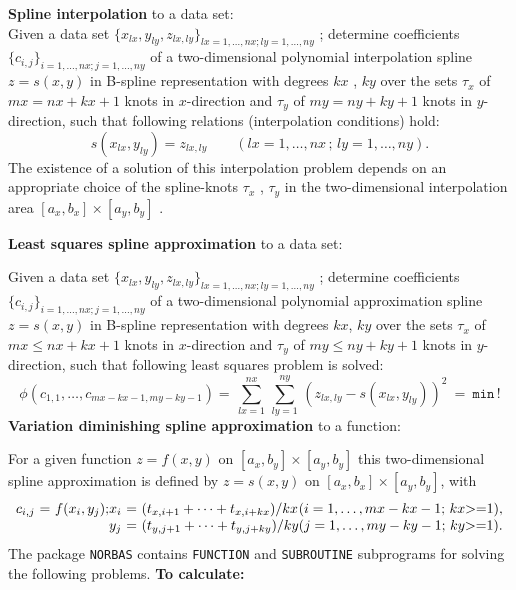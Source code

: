 {\bf Spline interpolation} to a data set: \\
Given a data set $\{x_{lx},y_{ly},z_{lx,ly}\}_{lx=1, \ldots ,nx ;
ly=1, \ldots , ny}$ ; determine coefficients
$\{c_{i,j}\}_{i=1, \ldots ,nx ; j=1, \ldots ,ny}$ of a
two-dimensional polynomial interpolation spline $z = s(x,y)$ in B-spline
representation with degrees $kx$ , $ky$ over the sets $\tau_x$
of $mx=nx+kx+1$ knots in $x$-direction and $\tau_y$ of $my=ny+ky+1$
knots in $y$-direction, such that following relations
(interpolation conditions) hold:
$$s(x_{lx},y_{ly}) = z_{lx,ly} \qquad
(lx=1, \ldots ,nx \, ; \, ly=1, \ldots ,ny) .$$
The existence of a solution of this interpolation problem depends
on an appropriate choice of the spline-knots $\tau_x$ , $\tau_y$ in the
two-dimensional interpolation area $[a_x,b_x] \times [a_y,b_y]$ .
\par
{\bf Least squares spline approximation} to a data set:
\par
Given a data set $\{x_{lx},y_{ly},z_{lx,ly}\}_{lx=1, \ldots ,nx ;
ly=1, \ldots , ny}$ ; determine coefficients
$\{c_{i,j}\}_{i=1, \ldots ,nx ; j=1, \ldots ,ny}$ of a
two-dimensional polynomial approximation spline $z = s(x,y)$ in B-spline
representation with degrees $kx$, $ky$ over the sets $\tau_x$
of $mx \le nx+kx+1$ knots in $x$-direction and $\tau_y$ of
$my \le ny+ky+1$ knots in $y$-direction, such that following
least squares problem is solved:
$$\phi (c_{1,1}, \ldots ,c_{mx-kx-1,my-ky-1}) = \,
\sum_{lx=1}^{nx} \, \sum_{ly=1}^{ny} \,
\left(z_{lx,ly}-s(x_{lx},y_{ly})\right)^2 \ = \ \mathtt{min\,!}$$
{\bf Variation diminishing spline approximation} to a function:
\par
For a given function $z = f(x,y)$ on $[a_x,b_y] \times [a_y,b_y]$ this
two-dimensional spline approximation is defined by $z = s(x,y)$
on $[a_x,b_x] \times [a_y,b_y]$, with
\[ \begin{array}{r@{\ =\ }l@{\qquad}r@{\ =\ }l@{\quad}l}
c_{i,j} & f(x_i,y_j); & x_i & (t_{x,i+1}+\cdots+t_{x,i+kx})/kx &
                               (i=1,\ldots,mx-kx-1;\,kx \ge 1), \\
\multicolumn{2}{c}{}  & y_j & (t_{y,j+1}+\cdots+t_{y,j+ky})/ky &
                               (j=1,\ldots,my-ky-1;\,ky \ge 1).
\end{array} \]
\newpage
The package {\tt NORBAS} contains {\tt FUNCTION} and {\tt SUBROUTINE}
subprograms for solving the following problems.
{\bf To calculate:}

